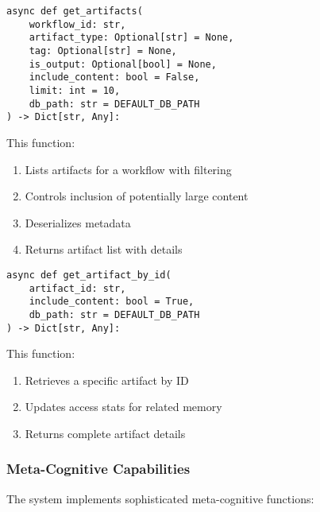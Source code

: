 \documentclass[12pt,a4paper]{article}
\begin{document}
\begin{pageablecode}
\begin{verbatim}
async def get_artifacts(
    workflow_id: str,
    artifact_type: Optional[str] = None,
    tag: Optional[str] = None,
    is_output: Optional[bool] = None,
    include_content: bool = False,
    limit: int = 10,
    db_path: str = DEFAULT_DB_PATH
) -> Dict[str, Any]:
\end{verbatim}
\end{pageablecode}
This function:
\begin{enumerate}[label=\arabic*.]
    \item Lists artifacts for a workflow with filtering
    \item Controls inclusion of potentially large content
    \item Deserializes metadata
    \item Returns artifact list with details
\end{enumerate}

\begin{pageablecode}
\begin{verbatim}
async def get_artifact_by_id(
    artifact_id: str,
    include_content: bool = True,
    db_path: str = DEFAULT_DB_PATH
) -> Dict[str, Any]:
\end{verbatim}
\end{pageablecode}
This function:
\begin{enumerate}[label=\arabic*.]
    \item Retrieves a specific artifact by ID
    \item Updates access stats for related memory
    \item Returns complete artifact details
\end{enumerate}

\subsubsection*{Meta-Cognitive Capabilities}

The system implements sophisticated meta-cognitive functions:
\end{document}
